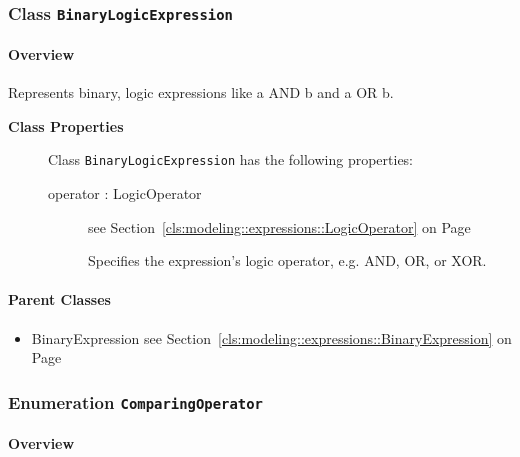 \subsubsection{\Large{Class \bfseries \texttt{BinaryLogicExpression}\normalfont}}
\label{cls:modeling::expressions::BinaryLogicExpression} 
\paragraph{Overview}

	
			
Represents binary, logic expressions like a AND b and a OR b.	
		
	


\begin{description}

	\item[\textbf{Class Properties}] Class \texttt{BinaryLogicExpression} has the following properties:
	\begin{description}
\item[operator : LogicOperator 	]
see Section~\ref{cls:modeling::expressions::LogicOperator} on Page~\pageref{cls:modeling::expressions::LogicOperator}
\hspace{\fill}
\nopagebreak


	
			
Specifies the expression's logic operator, e.g. AND, OR, or XOR.	
		
	
	\end{description}
	
	

\end{description}

\paragraph{Parent Classes}
\begin{itemize}
\item BinaryExpression see Section~\ref{cls:modeling::expressions::BinaryExpression} on Page~\pageref{cls:modeling::expressions::BinaryExpression}\end{itemize}
\subsubsection{\Large{Enumeration \bfseries \texttt{ComparingOperator}\normalfont}}
\label{cls:modeling::expressions::ComparingOperator} 
\paragraph{Overview}
	
